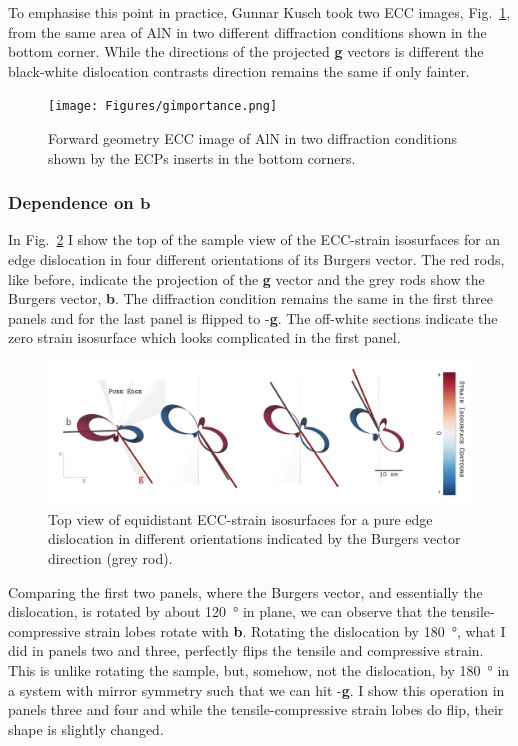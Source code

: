 To emphasise this point in practice, Gunnar Kusch took two ECC images, Fig.~\ref{fig:gimportance},  from the same area of AlN in two different diffraction conditions shown in the bottom corner.   While the directions of the projected \textbf{g} vectors is different the black-white dislocation contrasts direction remains the same if only fainter. 

\begin{figure}[ht]
    \centering
    \texttt{[image: Figures/gimportance.png]}
    \caption{Forward geometry ECC image of AlN in two diffraction conditions shown by the ECPs inserts in the bottom corners.}
    \label{fig:gimportance}
\end{figure}
\subsubsection{Dependence on \texorpdfstring{$\mathbf{b}$}{b}}

In Fig.~\ref{fig:bdependence} I show the top of the sample view of the ECC-strain isosurfaces for an edge dislocation in four different orientations of its Burgers vector.  The red rods, like before, indicate the projection of the \textbf{g} vector and the grey rods show the Burgers vector, \textbf{b}. The diffraction condition remains the same in the first three panels and for the last panel is flipped to -\textbf{g}. The off-white sections indicate the zero strain isosurface which looks complicated in the first panel.


\begin{figure}[ht]
    \centering
    \includegraphics[width=1.05\linewidth]{Figures/bdependence.png}
    \caption{Top view of equidistant ECC-strain isosurfaces for a pure edge dislocation in different orientations indicated by the Burgers vector direction (grey rod).  }
    \label{fig:bdependence}
\end{figure}

Comparing the first two panels, where the Burgers vector, and essentially the dislocation, is rotated by about \SI{120}{\degree} in plane, we can observe that the tensile-compressive strain lobes rotate with \textbf{b}. Rotating the dislocation by \SI{180}{\degree}, what I did in panels two and three, perfectly flips the tensile and compressive strain. This is unlike rotating the sample, but, somehow, not the dislocation, by \SI{180}{\degree} in a system with mirror symmetry such that we can hit -\textbf{g}. I show this operation in panels three and four and while the  tensile-compressive strain lobes do flip, their shape is slightly changed. 

